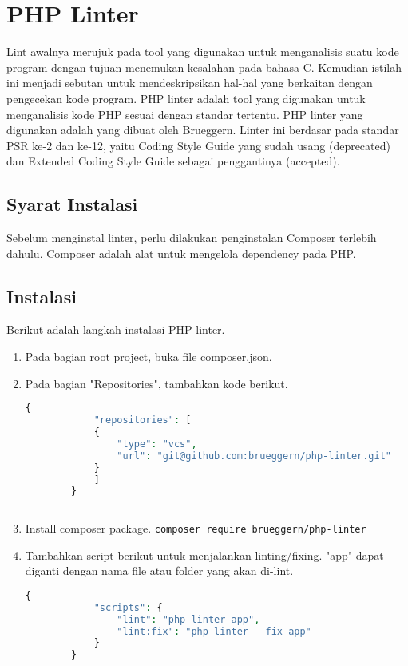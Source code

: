

\section{PHP Linter}
\label{sec:phplinter}
 
Lint awalnya merujuk pada tool yang digunakan untuk menganalisis suatu kode program dengan tujuan menemukan kesalahan pada bahasa C. Kemudian istilah ini menjadi sebutan untuk mendeskripsikan hal-hal yang berkaitan dengan pengecekan kode program. PHP linter adalah tool yang digunakan untuk menganalisis kode PHP sesuai dengan standar tertentu. 
PHP linter yang digunakan adalah yang dibuat oleh Brueggern. Linter ini berdasar pada standar PSR ke-2 dan ke-12, yaitu Coding Style Guide yang sudah usang (deprecated) dan Extended Coding Style Guide sebagai penggantinya (accepted). 


\subsection{Syarat Instalasi}
Sebelum menginstal linter, perlu dilakukan penginstalan Composer terlebih dahulu. Composer adalah alat untuk mengelola dependency pada PHP. 

\subsection{Instalasi}
Berikut adalah langkah instalasi PHP linter.
\begin{enumerate}
	\item Pada bagian root project, buka file composer.json.
	\item Pada bagian "Repositories", tambahkan kode berikut.
	\begin{lstlisting}[language=php, caption=kode kode, label=kode:aneh]
		{
			"repositories": [
			{
				"type": "vcs",
				"url": "git@github.com:brueggern/php-linter.git"
			}
			]
		}
		
	\end{lstlisting}
	
	\item Install composer package.
	\verb|composer require brueggern/php-linter|  
	
	\item Tambahkan script berikut untuk menjalankan linting/fixing. "app" dapat diganti dengan nama file atau folder yang akan di-lint. 
	\begin{lstlisting}[language=php, caption=kode kode, label=kode:aneh]
		{
			"scripts": {
				"lint": "php-linter app",
				"lint:fix": "php-linter --fix app"
			}
		}
		
	\end{lstlisting}
\end{enumerate}


